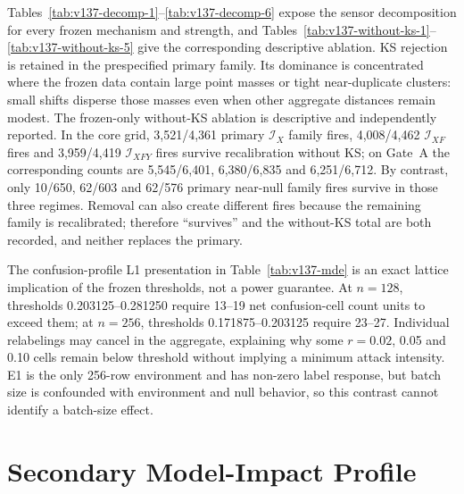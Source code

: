 \documentclass[10pt,journal,compsoc]{IEEEtran}
\newcommand{\IX}{\mathcal I_X}
\newcommand{\IXF}{\mathcal I_{XF}}
\newcommand{\IXFY}{\mathcal I_{XFY}}
\begin{document}
Tables~\ref{tab:v137-decomp-1}--\ref{tab:v137-decomp-6} expose the sensor
decomposition for every frozen mechanism and strength, and
Tables~\ref{tab:v137-without-ks-1}--\ref{tab:v137-without-ks-5} give the
corresponding descriptive ablation. KS rejection is retained in the prespecified primary
family. Its dominance is concentrated where the frozen data contain large
point masses or tight near-duplicate clusters: small shifts disperse those
masses even when other aggregate distances remain modest. The frozen-only
without-KS ablation is descriptive and independently reported. In the core
grid, 3,521/4,361 primary $\IX$ family fires, 4,008/4,462 $\IXF$ fires and
3,959/4,419 $\IXFY$ fires survive recalibration without KS; on Gate~A the
corresponding counts are 5,545/6,401, 6,380/6,835 and 6,251/6,712. By contrast,
only 10/650, 62/603 and 62/576 primary near-null family fires survive in those
three regimes. Removal can also create different fires because the remaining
family is recalibrated; therefore ``survives'' and the without-KS total are
both recorded, and neither replaces the primary.

The confusion-profile L1 presentation in Table~\ref{tab:v137-mde} is an exact
lattice implication of the frozen thresholds, not a power guarantee. At
$n=128$, thresholds 0.203125--0.281250 require 13--19 net confusion-cell count
units to exceed them; at $n=256$, thresholds 0.171875--0.203125 require 23--27.
Individual relabelings may cancel in the aggregate, explaining why some
$r=0.02$, 0.05 and 0.10 cells remain below threshold without implying a
minimum attack intensity. E1 is the only 256-row environment and has non-zero
label response, but batch size is confounded with environment and null
behavior, so this contrast cannot identify a batch-size effect.







\section{Secondary Model-Impact Profile}
\end{document}
